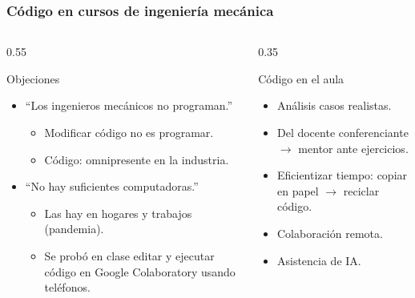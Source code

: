 \documentclass[aspectratio=169]{beamer} %
\begin{document}
\begin{frame}
	\frametitle{Código en cursos de ingeniería mecánica}
	\begin{columns}[c]
		\begin{column}{0.55 \textwidth}
			\begin{block}{Objeciones}
				\begin{itemize}
					\item ``Los ingenieros mecánicos no programan.''
					\begin{itemize}
						\item Modificar código no es programar.
						\item Código: omnipresente en la industria.
					\end{itemize}
					\item ``No hay suficientes computadoras.''
					\begin{itemize}
						\item Las hay en hogares y trabajos (pandemia).
						\item Se probó en clase editar y ejecutar código en Google Colaboratory usando teléfonos.
					\end{itemize}
				\end{itemize}
			\end{block}
		\end{column}
		\pause
		\begin{column}{0.35 \textwidth}
			\begin{block}{Código en el aula}
				\begin{itemize}
					\item Análisis casos realistas.
					\item Del docente conferenciante $\rightarrow$ mentor ante ejercicios.
					\item Eficientizar tiempo: copiar en papel $\rightarrow$ reciclar código.
					\item Colaboración remota.
					\item Asistencia de IA.
				\end{itemize}
			\end{block}
		\end{column}
	\end{columns}
\end{frame}
\end{document}
